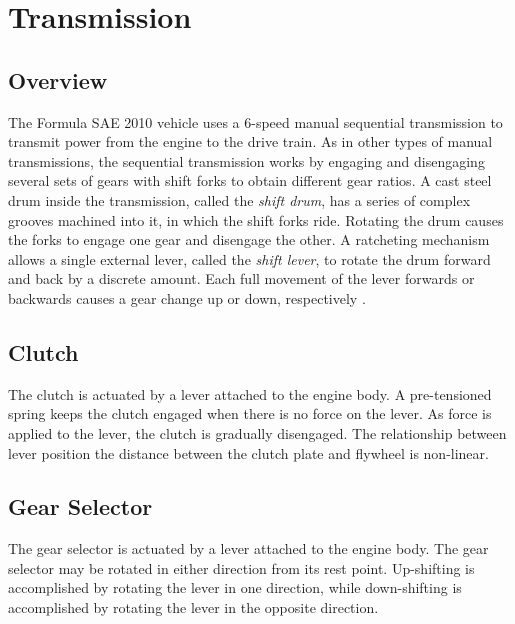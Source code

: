 \section{Transmission}

\subsection{Overview}

The Formula SAE 2010 vehicle uses a 6-speed manual sequential transmission to transmit power from the engine to the drive train. As in other types of manual transmissions, the sequential transmission works by engaging and disengaging several sets of gears with shift forks to obtain different gear ratios. A cast steel drum inside the transmission, called the \emph{shift drum}, has a series of complex grooves machined into it, in which the shift forks ride. Rotating the drum causes the forks to engage one gear and disengage the other. A ratcheting mechanism allows a single external lever, called the \emph{shift lever}, to rotate the drum forward and back by a discrete amount. Each full movement of the lever forwards or backwards causes a gear change up or down, respectively \cite{HowtoManualTransmission, cbr600}.


\subsection{Clutch}

The clutch is actuated by a lever attached to the engine body. A pre-tensioned spring keeps the clutch engaged when there is no force on the lever. As force is applied to the lever, the clutch is gradually disengaged. The relationship between lever position the distance between the clutch plate and flywheel is non-linear. 

\subsection{Gear Selector}

The gear selector is actuated by a lever attached to the engine body. The gear selector may be rotated in either direction from its rest point. Up-shifting is accomplished by rotating the lever in one direction, while down-shifting is accomplished by rotating the lever in the opposite direction. 

